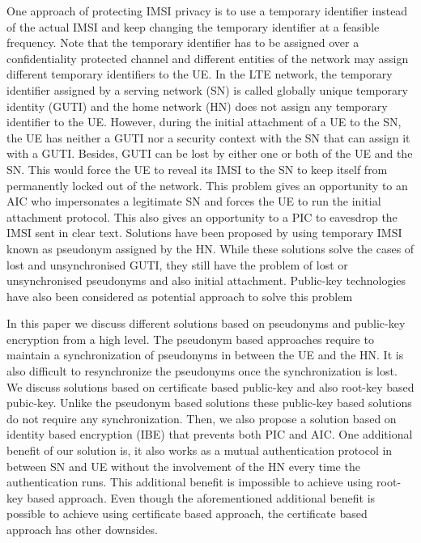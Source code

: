 \documentclass[runningheads,a4paper]{llncs} %
\begin{document}
\begin{figure}
\end{figure} One approach of protecting IMSI privacy is to use a temporary identifier instead of the actual IMSI and keep changing the temporary identifier at a feasible frequency. Note that the temporary identifier has to be assigned over a confidentiality protected channel and different entities of the network may assign different temporary identifiers to the UE. In the LTE network, the temporary identifier assigned by a serving network (SN) is called globally unique temporary identity (GUTI) and the home network (HN) does not assign any temporary identifier to the UE. However, during the initial attachment of a UE to the SN, the UE has neither a GUTI nor a security context with the SN that can assign it with a GUTI. Besides, GUTI can be lost by either one or both of the UE and the SN. This would force the UE to reveal its IMSI to the SN to keep itself from permanently locked out of the network. This problem gives an opportunity to an AIC who impersonates a legitimate SN and forces the UE to run the initial attachment protocol. This also gives an opportunity to a PIC to eavesdrop the IMSI sent in clear text. Solutions \cite{pseudonym_valtteri_philip, pseudonym_ericsson} have been proposed by using temporary IMSI known as pseudonym assigned by the HN. While these solutions solve the cases of lost and unsynchronised GUTI, they still have the problem of lost or unsynchronised pseudonyms and also initial attachment. Public-key technologies have also been considered as potential approach to solve this problem


In this paper we discuss different solutions based on pseudonyms and public-key encryption from a high level. The pseudonym based approaches require to maintain a synchronization of pseudonyms in between the UE and the HN. It is also difficult to resynchronize the pseudonyms once the synchronization is lost. We discuss solutions based on certificate based public-key and also root-key based pubic-key. Unlike the pseudonym based solutions these public-key based solutions do not require any synchronization. Then, we also propose a solution based on identity based encryption (IBE) that prevents both PIC and AIC. One additional benefit of our solution is, it also works as a mutual authentication protocol in between SN and UE without the involvement of the HN every time the authentication runs. This additional benefit is impossible to achieve using root-key based approach. Even though the aforementioned additional benefit is possible to achieve using certificate based approach, the certificate based approach has other downsides. 
\end{document}
